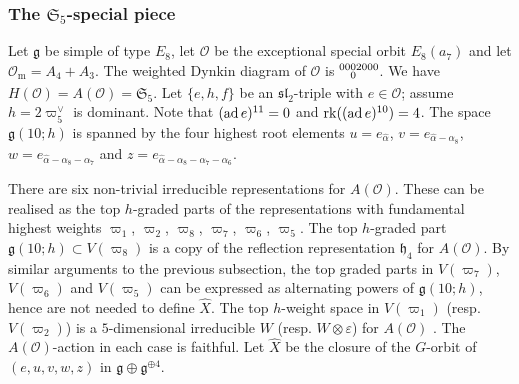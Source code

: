 \documentclass{amsart}
\theoremstyle{definition}
\newcommand{\m}{\mathrm{m}}
\newcommand{\g}{\mathfrak{g}}
\newcommand{\0}{\mathcal{O}}
\begin{document}
\subsubsection{The $\mathfrak{S}_5$-special piece}

Let $\g$ be simple of type $E_8$, let $\0$ be the exceptional special orbit $E_8(a_7)$ and let $\0_\m=A_4+A_3$.
The weighted Dynkin diagram of $\0$ is $\scriptsize{\begin{aligned} 00 &02000 \\[-1.8mm] &0\end{aligned}}$.
We have $H(\0)=A(\0)=\mathfrak{S}_5$.
Let $\{ e,h,f\}$ be an $\mathfrak{sl}_2$-triple with $e\in\0$; assume $h=2\varpi_5^\vee$ is dominant.
Note that $({\rm ad}\, e)^{11}=0$ and ${\rm rk}(({\rm ad}\, e)^{10})=4$.
The space ${\mathfrak g}(10;h)$ is spanned by the four highest root elements $u=e_{\hat\alpha}$, $v=e_{\hat\alpha-\alpha_8}$, $w=e_{\hat\alpha-\alpha_8-\alpha_7}$ and $z=e_{\hat\alpha-\alpha_8-\alpha_7-\alpha_6}$.

There are six non-trivial irreducible representations for $A(\0)$.
These can be realised as the top $h$-graded parts of the representations with fundamental highest weights $\varpi_1$, $\varpi_2$, $\varpi_8$, $\varpi_7$, $\varpi_6$, $\varpi_5$.
The top $h$-graded part $\g(10;h)\subset V(\varpi_8)$ is a copy of the reflection representation ${\mathfrak h}_4$ for $A(\0)$.
By similar arguments to the previous subsection, the top graded parts in $V(\varpi_7)$, $V(\varpi_6)$ and $V(\varpi_5)$ can be expressed as alternating powers of $\g(10;h)$, hence are not needed to define $\hat{X}$.
The top $h$-weight space in $V(\varpi_1)$ (resp. $V(\varpi_2)$) is a $5$-dimensional irreducible $W$ (resp. $W\otimes\varepsilon$) for $A(\0)$ \cite{Sommers:Localsystems}.
The $A(\0)$-action in each case is faithful.
Let $\hat{X}$ be the closure of the $G$-orbit of $(e,u,v,w,z)$ in $\g\oplus \g^{\oplus 4}$.


\end{document}
